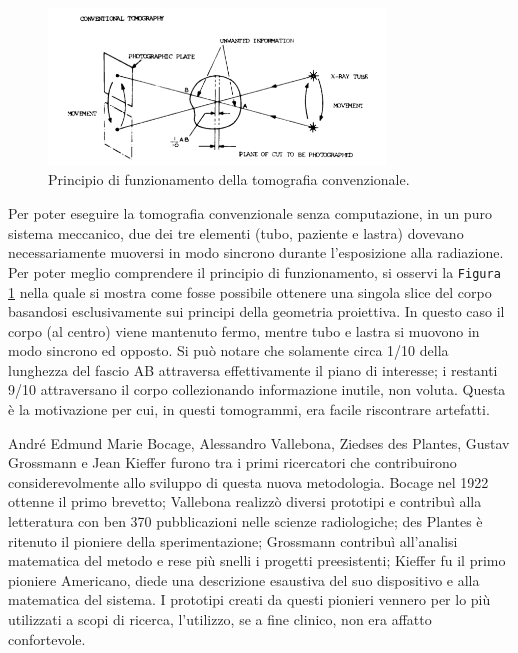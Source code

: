 \documentclass[a4paper,12pt, doubleside]{report}
\begin{document}
                    \begin{figure}[h]
                        \centering
                        \includegraphics[width=0.8\textwidth]{conventional}
                        \caption{Principio di funzionamento della tomografia convenzionale.}
                        \label{fig:conventional}
                    \end{figure}
                            
                    Per poter eseguire la tomografia convenzionale senza computazione, in un puro sistema meccanico, due dei tre elementi (tubo, paziente e lastra) dovevano necessariamente muoversi in modo sincrono durante l’esposizione alla radiazione.
                    Per poter meglio comprendere il principio di funzionamento, si osservi la \texttt{Figura \ref{fig:conventional}} nella quale si mostra come fosse possibile ottenere una singola slice del corpo basandosi esclusivamente sui principi della geometria proiettiva. In questo caso il corpo (al centro) viene mantenuto fermo, mentre tubo e lastra si muovono in modo sincrono ed opposto. Si può notare che solamente circa 1/10 della lunghezza del fascio AB attraversa effettivamente il piano di interesse; i restanti 9/10 attraversano il corpo collezionando informazione inutile, non voluta. Questa è la motivazione per cui, in questi tomogrammi, era facile riscontrare artefatti\cite{hounsfield-nobel-lecture}.
    
                \par
                    André Edmund Marie Bocage, Alessandro Vallebona, Ziedses des Plantes, Gustav Grossmann e Jean Kieffer furono tra i primi ricercatori che contribuirono considerevolmente allo sviluppo di questa nuova metodologia. Bocage nel 1922 ottenne il primo brevetto; Vallebona realizzò diversi prototipi e contribuì alla letteratura con ben 370 pubblicazioni nelle scienze radiologiche\cite{vallebona-ricordo}; des Plantes è ritenuto il pioniere della sperimentazione; Grossmann contribuì all’analisi matematica del metodo e rese più snelli i progetti preesistenti; Kieffer fu il primo pioniere Americano, diede una descrizione esaustiva del suo dispositivo e alla matematica del sistema. I prototipi creati da questi pionieri vennero per lo più utilizzati a scopi di ricerca, l'utilizzo, se a fine clinico, non era affatto confortevole.
    
\end{document}
